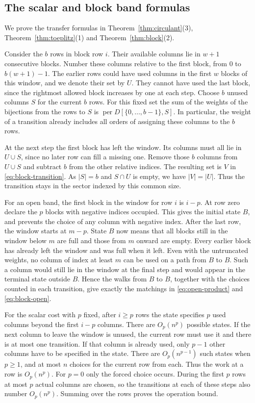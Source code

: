 \documentclass[11pt,reqno]{amsart}
\theoremstyle{remark}
\numberwithin{equation}{section}
\newcommand{\per}{\operatorname{per}}
\begin{document}
\subsection{The scalar and block band formulas}

We prove the transfer formulas in Theorem~\ref{thm:circulant}(3),
Theorem~\ref{thm:toeplitz}(1) and Theorem~\ref{thm:block}(2).

Consider the \(b\) rows in block row \(i\). Their available columns lie
in \(w+1\) consecutive blocks. Number these columns relative to the first
block, from \(0\) to \(b(w+1)-1\). The earlier rows could have used
columns in the first \(w\) blocks of this window, and we denote their set
by \(U\). They cannot have used the last block, since the rightmost
allowed block increases by one at each step. Choose \(b\) unused columns
\(S\) for the current \(b\) rows. For this fixed set the sum of the
weights of the bijections from the rows to \(S\) is \(\per
D[\{0,\ldots,b-1\},S]\). In particular, the weight of a transition
already includes all orders of assigning these columns to the \(b\) rows.

At the next step the first block has left the window. Its columns must
all lie in \(U\cup S\), since no later row can fill a missing one. Remove
those \(b\) columns from \(U\cup S\) and subtract \(b\) from the other
relative indices. The resulting set is \(V\) in
\eqref{eq:block-transition}. As \(|S|=b\) and \(S\cap U\) is empty, we
have \(|V|=|U|\). Thus the transition stays in the sector indexed by this
common size.

For an open band, the first block in the window for row \(i\) is \(i-p\).
At row zero declare the \(p\) blocks with negative indices occupied. This
gives the initial state \(B\), and prevents the choice of any column with
negative index. After the last row, the window starts at \(m-p\). State
\(B\) now means that all blocks still in the window below \(m\) are full
and those from \(m\) onward are empty. Every earlier block has already
left the window and was full when it left. Even with the untruncated
weights, no column of index at least \(m\) can be used on a path from
\(B\) to \(B\). Such a column would still lie in the window at the final
step and would appear in the terminal state outside \(B\). Hence the
walks from \(B\) to \(B\), together with the choices counted in each
transition, give exactly the matchings in \eqref{eq:open-product} and
\eqref{eq:block-open}.

For the scalar cost with \(p\) fixed, after \(i\ge p\) rows the state
specifies \(p\) used columns beyond the first \(i-p\) columns. There are
\(O_p(n^p)\) possible states. If the next column to leave the window is
unused, the current row must use it and there is at most one transition.
If that column is already used, only \(p-1\) other columns have to be
specified in the state. There are \(O_p(n^{p-1})\) such states when
\(p\ge1\), and at most \(n\) choices for the current row from each. Thus
the work at a row is \(O_p(n^p)\). For \(p=0\) only the forced choice
occurs. During the first \(p\) rows at most \(p\) actual columns are
chosen, so the transitions at each of these steps also number
\(O_p(n^p)\). Summing over the rows proves the operation bound.
\end{document}
